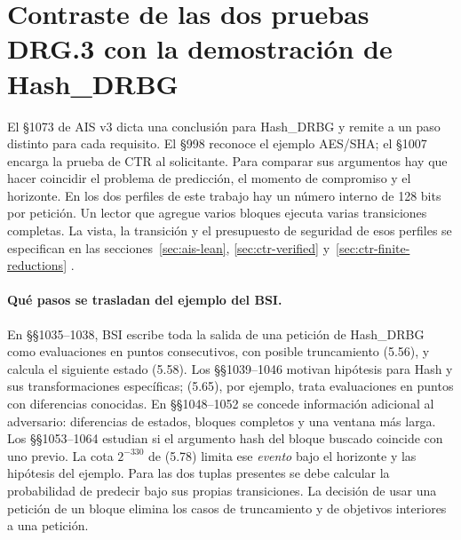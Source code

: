 \section{Contraste de las dos pruebas DRG.3 con la demostración de Hash\_DRBG}
\label{sec:hash-comparison}
El §1073 de AIS v3 dicta una conclusión para Hash\_DRBG y remite a un paso
distinto para cada requisito. El §998 reconoce el ejemplo AES/SHA; el §1007
encarga la prueba de CTR al solicitante. Para comparar sus argumentos hay que
hacer coincidir el problema de predicción, el momento de compromiso y el
horizonte. En los dos perfiles de este trabajo hay un número interno de
128 bits por petición. Un lector que agregue varios bloques ejecuta varias
transiciones completas. La vista, la transición y el presupuesto de seguridad
de esos perfiles se especifican en las secciones~\ref{sec:ais-lean},
\ref{sec:ctr-verified} y~\ref{sec:ctr-finite-reductions}
\cite[§§998,1007,1033--1075]{ais}.

\paragraph{Qué pasos se trasladan del ejemplo del BSI.}
En §§1035--1038, BSI escribe toda la salida de una petición de Hash\_DRBG
como evaluaciones en puntos consecutivos, con posible truncamiento (5.56),
y calcula el siguiente estado (5.58). Los §§1039--1046 motivan hipótesis
para Hash y sus transformaciones específicas; (5.65), por ejemplo, trata
evaluaciones en puntos con diferencias conocidas. En §§1048--1052 se concede
información adicional al adversario: diferencias de estados, bloques completos
y una ventana más larga. Los §§1053--1064 estudian si el argumento hash del bloque
buscado coincide con uno previo. La cota \(2^{-330}\) de (5.78) limita ese
\emph{evento} bajo el horizonte y las hipótesis del ejemplo. Para las dos tuplas
presentes se debe calcular la probabilidad de predecir bajo sus propias
transiciones. La decisión de usar una petición de un bloque elimina los
casos de truncamiento y de objetivos interiores a una petición.

